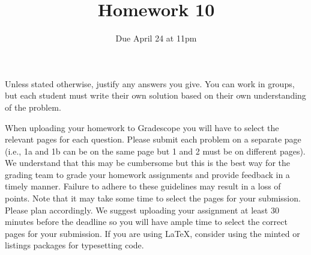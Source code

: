 \documentclass[12pt]{article}
\begin{document}
\title{\sc Homework 10}
\date{Due April 24 at 11pm} 
\author{}
\maketitle




\newtheorem*{problem}{Problem}
\newtheorem*{heuristic}{Heuristic}
\newtheorem*{conjecture}{Conjecture}
\newtheorem{theorem}{Theorem}[section]
\newtheorem{corollary}[theorem]{Corollary}
\newtheorem{prop}[theorem]{Proposition}
\newtheorem{lemma}[theorem]{Lemma}
\newtheorem{definition}[theorem]{Definition}
\theoremstyle{remark}
\newtheorem{example}[theorem]{Example}
\newtheorem{remark}[theorem]{Remark}
\newtheorem{exercise}[theorem]{Exercise}


Unless stated otherwise, justify any answers you give. You can work in groups, but each student
must write their own solution based on their own understanding of the problem.

When uploading your homework to Gradescope you will have to select the relevant pages
for each question. Please submit each problem on a separate page (i.e., 1a and 1b can be on
the same page but 1 and 2 must be on different pages). We understand that this may be
cumbersome but this is the best way for the grading team to grade your homework assignments and provide feedback in a timely manner. Failure to adhere to these guidelines may
result in a loss of points. Note that it may take some time to select the pages for your submission. Please plan accordingly. We suggest uploading your assignment at least 30 minutes
before the deadline so you will have ample time to select the correct pages for your submission. If you are using \LaTeX, consider using the minted or listings packages for typesetting code.

\medskip
\end{document}
